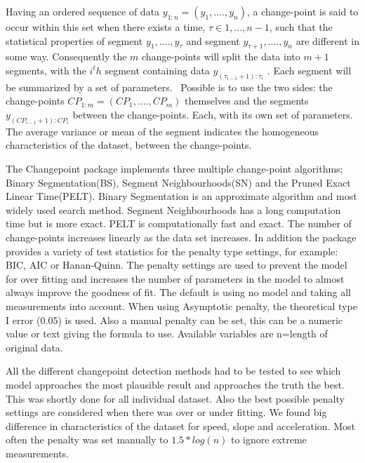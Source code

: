 Having an ordered sequence of data $y_{1:n} = (y_{1}, .... , y_{n})$, a change-point is said to occur within this set when there exists a time, $τ ∈ {1, . . . , n − 1}$, such that the statistical properties of segment ${y_{1}, .... , y_{τ}}$ and segment ${y_{τ+1}, .... , y_{n}}$ are different in some way. Consequently the $m$ change-points will split the data into $m + 1$ segments, with the $i^th$ segment containing data $y_{(τ_{i−1} +1):τ_{i}}$ . Each segment will be summarized by a set of parameters.~\cite{killick2014} Possible is to use the two sides: the change-points $CP_{1:m} = (CP_{1}, .... , CP_{m})$ themselves and the segments $y_{(CP_{i−1} +1):CP_{i}}$ between the change-points. Each, with its own set of parameters. 
The average variance or mean of the segment indicates the homogeneous  characteristics of the dataset, between the change-points. 

The Changepoint package implements three multiple change-point algorithms; Binary Segmentation(BS), Segment Neighbourhoods(SN) and the Pruned Exact Linear Time(PELT). Binary Segmentation is an approximate algorithm and most widely used search method. Segment Neighbourhoods has a long computation time but is more exact. PELT is computationally fast and exact. The number of change-points increases linearly as the data set increases. 
In addition the package provides a variety of test statistics for the penalty type settings, for example: BIC, AIC or Hanan-Quinn. 
The penalty settings are used to prevent the model for over fitting and increases the number of parameters in the model to almost always improve the goodness of fit. The default is using no model and taking all measurements into account. When using Asymptotic penalty, the theoretical type I error (0.05) is used. Also a manual penalty can be set, this can be a numeric value or text giving the formula to use. Available variables are n=length of original data. ~\cite{killick2014}

All the different changepoint detection methods had to be tested to see which model approaches the most plausible result and approaches the truth the best. This was shortly done for all individual dataset. Also the best possible penalty settings are considered when there was over or under fitting. We found big difference in characteristics of the dataset for speed, slope and acceleration. Most often the penalty was set manually to $1.5 * log(n)$ to ignore extreme measurements. 

